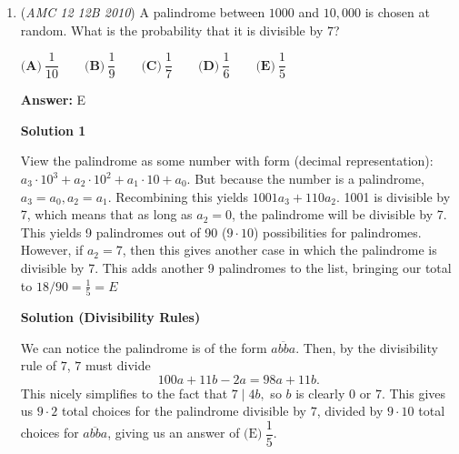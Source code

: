 \begin{enumerate}
 $\textbf{(A)}\ \dfrac{49}{101} \qquad \textbf{(B)}\ \dfrac{50}{101} \qquad \textbf{(C)}\ \dfrac{1}{2} \qquad \textbf{(D)}\ \dfrac{51}{101} \qquad \textbf{(E)}\ \dfrac{50}{99}$

 \textbf{Answer: }B



\textbf{Solution}

We first sum the first $99$ numbers: $\frac{99(100)}{2}=99\cdot50$. Then, we know that the sum of the series is $99\cdot50+x$. There are $100$ terms, so we can divide this sum by $100$ and set it equal to $100x$:
 \[\frac{99\cdot50+x}{100}=100x \Rightarrow 99\cdot50=100^2x-x\Rightarrow \frac{99\cdot50}{100^2-1}=x\]Using difference of squares:
 \[x=\frac{99\cdot50}{101\cdot99}=\frac{50}{101}\]Thus, the answer is $\boxed{\textbf{(B) }\frac{50}{101}}$.

 


	\item (\textit{AMC 12 12B 2010}) A palindrome between $1000$ and $10,000$ is chosen at random. What is the probability that it is divisible by $7$?


 $\textbf{(A)}\ \dfrac{1}{10} \qquad \textbf{(B)}\ \dfrac{1}{9} \qquad \textbf{(C)}\ \dfrac{1}{7} \qquad \textbf{(D)}\ \dfrac{1}{6} \qquad \textbf{(E)}\ \dfrac{1}{5}$

 \textbf{Answer: }E



\textbf{Solution 1}

View the palindrome as some number with form (decimal representation):$a_3 \cdot 10^3 + a_2 \cdot 10^2 + a_1 \cdot 10 + a_0$. But because the number is a palindrome, $a_3 = a_0, a_2 = a_1$. Recombining this yields $1001a_3 + 110a_2$. 1001 is divisible by 7, which means that as long as $a_2 = 0$, the palindrome will be divisible by 7. This yields 9 palindromes out of 90 ($9 \cdot 10$) possibilities for palindromes. However, if $a_2 = 7$, then this gives another case in which the palindrome is divisible by 7. This adds another 9 palindromes to the list, bringing our total to $18/90 = \boxed {\frac{1}{5} } = \boxed {E}$




\textbf{Solution (Divisibility Rules)}

We can notice the palindrome is of the form $\overline{abba}$. Then, by the divisibility rule of $7$, $7$ must divide 
 \[100a+11b-2a = 98a+11b.\] This nicely simplifies to the fact that $7 \mid 4b,$ so $b$ is clearly $0$ or $7$. This gives us $9 \cdot 2$ total choices for the palindrome divisible by $7$, divided by $9 \cdot 10$ total choices for $\overline{abba}$, giving us an answer of $\boxed{\text{(E)}} \ \dfrac{1}{5}$.


\end{enumerate}
